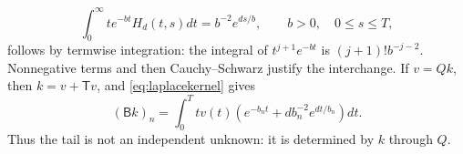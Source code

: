\begin{equation}\label{eq:laplacekernel}
\int_0^\infty te^{-bt}H_d(t,s)dt=b^{-2}e^{ds/b},\qquad b>0,\quad 0\le s\le T,
\end{equation}
follows by termwise integration: the integral of \(t^{j+1}e^{-bt}\) is \((j+1)!b^{-j-2}\). Nonnegative terms and then Cauchy--Schwarz justify the interchange. If \(v=Qk\), then \(k=v+\mathsf Tv\), and \eqref{eq:laplacekernel} gives
\begin{equation}\label{eq:exactidentity}
(\mathsf Bk)_n=\int_0^T t v(t)\left(e^{-b_nt}+d b_n^{-2}e^{dt/b_n}\right)dt.
\end{equation}
Thus the tail is not an independent unknown: it is determined by \(k\) through \(Q\).
